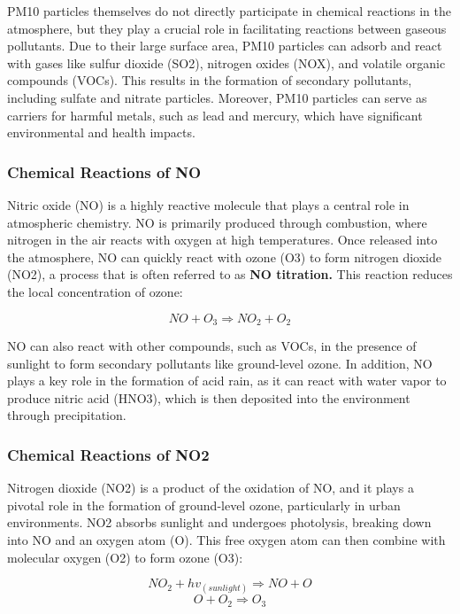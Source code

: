 \documentclass{modeleRapport}
\begin{document}
PM10 particles themselves do not directly participate in chemical reactions in the atmosphere, but they play a crucial 
role in facilitating reactions between gaseous pollutants. Due to their large surface area, PM10 particles can adsorb 
and react with gases like sulfur dioxide (SO2), nitrogen oxides (NOX), and volatile organic compounds (VOCs). 
This results in the formation of secondary pollutants, including sulfate and nitrate particles.
Moreover, PM10 particles can serve as carriers for harmful metals, such as lead and mercury, which have significant 
environmental and health impacts.\\

\subsubsection{Chemical Reactions of NO}

Nitric oxide (NO) is a highly reactive molecule that plays a central role in atmospheric chemistry. NO is primarily 
produced through combustion, where nitrogen in the air reacts with oxygen at high temperatures. Once released into 
the atmosphere, NO can quickly react with ozone (O3) to form nitrogen dioxide (NO2), a process that is often referred to as 
\textbf{NO titration.} This reaction reduces the local concentration of ozone:

$$NO + O_3 \Rightarrow NO_2 + O_2$$

NO can also react with other compounds, such as VOCs, in the presence of sunlight to form secondary pollutants like 
ground-level ozone. In addition, NO plays a key role in the formation of acid rain, as it can react with water vapor 
to produce nitric acid (HNO3), which is then deposited into the environment through precipitation.\\

\subsubsection{Chemical Reactions of NO2}

Nitrogen dioxide (NO2) is a product of the oxidation of NO, and it plays a pivotal role in the formation of ground-level 
ozone, particularly in urban environments. NO2 absorbs sunlight and undergoes photolysis, breaking down into NO and an 
oxygen atom (O). This free oxygen atom can then combine with molecular oxygen (O2) to form ozone (O3):

$$NO_2 + hv_{(sunlight)} \Rightarrow NO+O$$
$$O+O_2 \Rightarrow O_3$$
\end{document}
